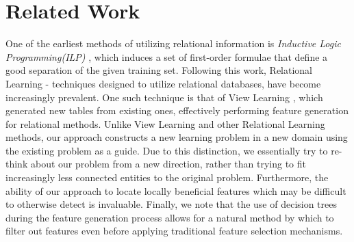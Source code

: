 \documentclass[twoside,11pt]{article}
\theoremstyle{definition}
\begin{document}






\section{Related Work}
One of the earliest methods of utilizing relational information is \emph{Inductive Logic Programming(ILP)} \cite{quinlan1990learning,muggleton1991inductive}, which induces a set of first-order formulae that define a good separation of the given training set.
Following this work, Relational Learning - techniques designed to utilize relational databases, have become increasingly prevalent. One such technique is that of View Learning \cite{davis2005view}, which generated new tables from existing ones, effectively performing feature generation for relational methods.
Unlike View Learning and other Relational Learning methods, our approach constructs a new learning problem in a new domain using the existing problem as a guide. Due to this distinction, we essentially try to re-think about our problem from a new direction, rather than trying to fit increasingly less connected entities to the original problem. Furthermore, the ability of our approach to locate locally beneficial features which may be difficult to otherwise detect is invaluable. Finally, we note that the use of decision trees during the feature generation process allows for a natural method by which to filter out features even before applying traditional feature selection mechanisms.
\end{document}
